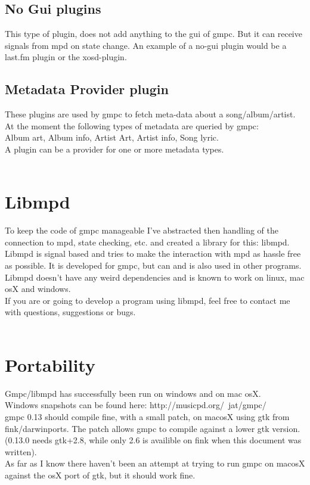 \documentclass{article}
\begin{document}
\subsection {No Gui plugins}
This type of plugin, does not add anything to the gui of gmpc. But it can receive signals from mpd on state change. An example of a no-gui plugin would be a last.fm plugin or the xosd-plugin.\\
\subsection {Metadata Provider plugin}
These plugins are used by gmpc to fetch meta-data about a song/album/artist. At the moment the following types of metadata are queried by gmpc:\\
Album art, Album info, Artist Art, Artist info, Song lyric.\\ A plugin can be a provider for one or more metadata types.\\
\\
\section {Libmpd}
To keep the code of gmpc manageable I've abstracted then handling of the connection to mpd, state checking, etc. and created a library for this: libmpd. Libmpd is signal based and tries to make the interaction with mpd as hassle free as possible. It is developed for gmpc, but can and is also used in other programs. Libmpd doesn't have any weird dependencies and is known to work on linux, mac osX and windows.\\
If you are or going to develop a program using libmpd, feel free to contact me with questions, suggestions or bugs.\\
\\

\section {Portability}
Gmpc/libmpd has successfully been run on windows and on mac osX. \\
Windows snapshots can be found here: http://musicpd.org/~jat/gmpc/\\
gmpc 0.13 should compile fine, with a small patch, on macosX using gtk from fink/darwinports. The patch allows gmpc to compile against a lower gtk version. (0.13.0 needs gtk+2.8, while only 2.6 is availible on fink when this document was written).\\
As far as I know there haven't been an attempt at trying to run gmpc on macosX against the osX port of gtk, but it should work fine.\\
\end{document}

